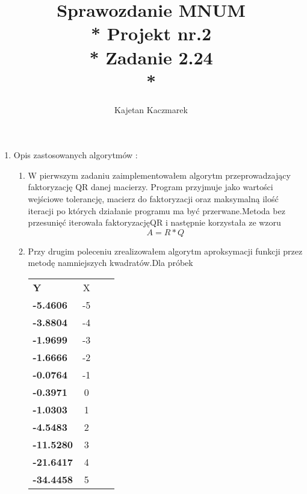 \documentclass[a4paper, 11pt]{article}
\author{Kajetan Kaczmarek}
\begin{document}
\title{Sprawozdanie MNUM \\* Projekt nr.2 \\* 
Zadanie 2.24 \\*}
\maketitle

\begin{enumerate}

\item Opis zastosowanych algorytmów : 
\begin{enumerate}
\item W pierwszym zadaniu zaimplementowałem algorytm przeprowadzający faktoryzację QR danej macierzy. Program przyjmuje jako wartości wejściowe tolerancję, macierz do faktoryzacji oraz maksymalną ilość iteracji po których działanie programu ma być przerwane.Metoda bez przesunięć iterowała faktoryzacjęQR i następnie korzystała ze wzoru 
\[ A = R*Q\]
\item Przy drugim poleceniu zrealizowałem algorytm aproksymacji funkcji przez metodę namniejszych kwadratów.Dla próbek
\begin{center}
\begin{tabular}{ l*{2}{c}r}
  \hline			
\bfseries Y & X \\
\bfseries -5.4606 & -5 \\
\bfseries -3.8804 & -4 \\
\bfseries -1.9699 & -3 \\
\bfseries -1.6666 & -2 \\
\bfseries -0.0764 & -1 \\
\bfseries -0.3971 & 0 \\
\bfseries -1.0303 & 1 \\
\bfseries -4.5483 & 2 \\
\bfseries -11.5280  & 3 \\
\bfseries -21.6417 & 4 \\
\bfseries -34.4458 & 5 \\
  \hline  
\end{tabular}
\end{center}
\bigskip


\end{enumerate}
\end{enumerate}
\end{document}
